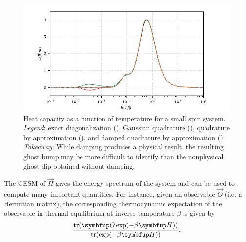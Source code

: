 \begin{figure}[htb]
    \includegraphics[width=\textwidth]{imgs/ch4_spin_heat_capacity.pdf}
    \caption[Heat capacity as a function of temperature for a small spin system.]{%
    Heat capacity as a function of temperature for a small spin system.
    \hspace{.25em}\emph{Legend}:
    exact diagonalization 
    ({\protect{}}),
    Gaussian quadrature
    ({\protect{}}),
    quadrature by approximation 
    ({\protect{}}), and
    damped quadrature by approximation 
    ({\protect{}}).
    \hspace{.25em}\emph{Takeaway}: While damping produces a physical result, the resulting ghost bump may be more difficult to identify than the nonphysical ghost dip obtained without damping.
    }
    \label{fig:spin_heat_capacity}
\end{figure}

The CESM of \( \vec{H} \) gives the energy spectrum of the system and can be used to compute many important quantities.
For instance, given an observable \( \vec{O} \) (i.e. a Hermitian matrix), the corresponding thermodynamic expectation of the observable in thermal equilibrium at inverse temperature \( \beta \)  is given by
\begin{equation*}
    \frac{\tr(\vec{O}\exp(-\beta \vec{H}))}{\tr(\exp(-\beta\vec{H}))}.
\end{equation*}

